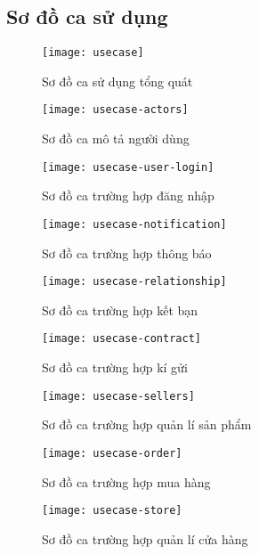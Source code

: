 \subsection{Sơ đồ ca sử dụng}

\begin{figure}[h!]
	\caption{Sơ đồ ca sử dụng tổng quát}
	\texttt{[image: usecase]}
\end{figure}

\begin{figure}[h!]
	\begin{center}	
		\caption{Sơ đồ ca mô tả người dùng}
		\texttt{[image: usecase-actors]}
	\end{center}
\end{figure}

\begin{figure}[h!]
	\begin{center}	
		\caption{Sơ đồ ca trường hợp đăng nhập}
		\texttt{[image: usecase-user-login]}
	\end{center}
\end{figure}

\begin{figure}[h!]
	\begin{center}	
		\caption{Sơ đồ ca trường hợp thông báo}
		\texttt{[image: usecase-notification]}
	\end{center}
\end{figure}

\begin{figure}[h!]
	\begin{center}	
		\caption{Sơ đồ ca trường hợp kết bạn}
		\texttt{[image: usecase-relationship]}
	\end{center}
\end{figure}

\begin{figure}[h!]
	\begin{center}	
		\caption{Sơ đồ ca trường hợp kí gửi}
		\texttt{[image: usecase-contract]}
	\end{center}
\end{figure}

\begin{figure}[h!]
	\begin{center}	
		\caption{Sơ đồ ca trường hợp quản lí sản phẩm}
		\texttt{[image: usecase-sellers]}
	\end{center}
\end{figure}

\begin{figure}[h!]
	\begin{center}	
		\caption{Sơ đồ ca trường hợp mua hàng}
		\texttt{[image: usecase-order]}
	\end{center}
\end{figure}

\begin{figure}[h!]
	\begin{center}	
		\caption{Sơ đồ ca trường hợp quản lí cửa hàng}
		\texttt{[image: usecase-store]}
	\end{center}
\end{figure}